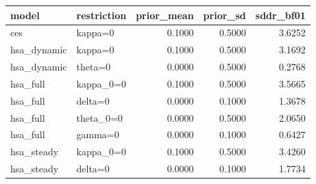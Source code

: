 \begin{tabular}{llrrr}
\toprule
model & restriction & prior\_mean & prior\_sd & sddr\_bf01 \\
\midrule
ces & kappa=0 & 0.1000 & 0.5000 & 3.6252 \\
hsa\_dynamic & kappa=0 & 0.1000 & 0.5000 & 3.1692 \\
hsa\_dynamic & theta=0 & 0.0000 & 0.5000 & 0.2768 \\
hsa\_full & kappa\_0=0 & 0.1000 & 0.5000 & 3.5665 \\
hsa\_full & delta=0 & 0.0000 & 0.1000 & 1.3678 \\
hsa\_full & theta\_0=0 & 0.0000 & 0.5000 & 2.0650 \\
hsa\_full & gamma=0 & 0.0000 & 0.1000 & 0.6427 \\
hsa\_steady & kappa\_0=0 & 0.1000 & 0.5000 & 3.4260 \\
hsa\_steady & delta=0 & 0.0000 & 0.1000 & 1.7734 \\
\bottomrule
\end{tabular}
